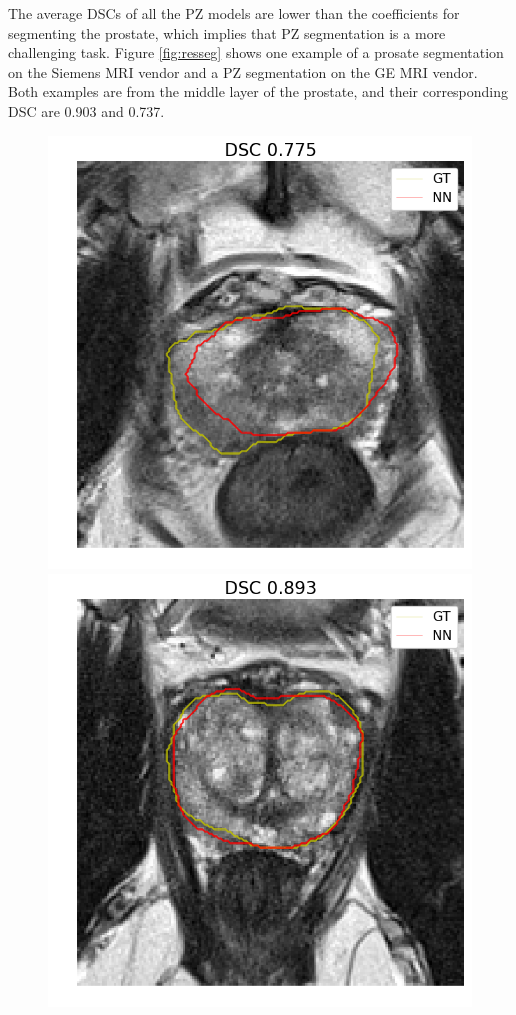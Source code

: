 The average DSCs of all the PZ models are lower than the coefficients for segmenting the prostate, which implies that PZ segmentation is a more challenging task.
Figure \ref{fig:resseg} shows one example of a prosate segmentation on the Siemens MRI vendor and a PZ segmentation on the GE MRI vendor. Both examples are from the middle layer of the prostate, and their corresponding DSC are 0.903 and 0.737.
 \begin{figure}[h]
    \centering
    \includegraphics[totalheight=.2\textheight]{imgs/results/Prostate_Px_Challenge__P_yes_ROI_MIN_Case-0128.png}
    \includegraphics[totalheight=.2\textheight]{imgs/results/Prostate_Px_Challenge__P_yes_ROI_MEAN_Case-0176.png}

\end{figure}
